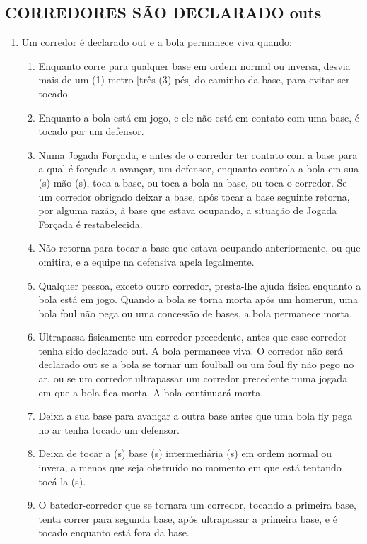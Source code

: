 \begin{multicols}{2}
	\subsection{CORREDORES S\~AO DECLARADO \glspl{out}} 
	
	\begin{enumerate}[label=\alph*)]
		\item Um corredor \'e declarado \gls{out} e a bola permanece viva quando: 
		\begin{enumerate}[label=\roman*.]
			\item Enquanto corre para qualquer base em ordem normal ou inversa, desvia mais de um (1) metro [tr\^es (3) p\'es] do caminho da base, para evitar ser tocado. 
			\item Enquanto a bola est\'a em jogo, e ele n\~ao est\'a em contato com uma base, \'e tocado por um defensor. 
			\item Numa Jogada For\c{c}ada, e antes de o corredor ter contato com a base para a qual \'e for\c{c}ado a avan\c{c}ar, um defensor, enquanto controla a bola em sua (s) m\~ao (s), toca a base, ou toca a bola na base, ou toca o corredor. Se um corredor obrigado deixar a base, ap\'os tocar a base seguinte retorna, por alguma raz\~ao, \`a base que estava ocupando, a situa\c{c}\~ao de Jogada For\c{c}ada \'e restabelecida. 
			\item N\~ao retorna para tocar a base que estava ocupando anteriormente, ou que omitira, e a equipe na defensiva apela legalmente. 
			\item Qualquer pessoa, exceto outro corredor, presta-lhe ajuda f\'isica enquanto a bola est\'a em jogo. Quando a bola se torna morta ap\'os um \gls{homerun}, uma bola \gls{foul} n\~ao pega ou uma concess\~ao de bases, a bola permanece morta. 
			\item Ultrapassa fisicamente um corredor precedente, antes que esse corredor tenha sido declarado \gls{out}. A bola permanece viva. O corredor n\~ao ser\'a declarado \gls{out} se a bola se tornar um \gls{foulball} ou um \gls{foul fly} n\~ao pego no ar, ou se um corredor ultrapassar um corredor precedente numa jogada em que a bola fica morta. A bola continuar\'a morta. 
			\item Deixa a sua base para avan\c{c}ar a outra base antes que uma bola \gls{fly} pega no ar tenha tocado um defensor. 
			\item Deixa de tocar a (s) base (s) intermedi\'aria (s) em ordem normal ou invera, a menos que seja obstru\'ido no momento em que est\'a tentando toc\'a-la (s). 
			\item O batedor-corredor que se tornara um corredor, tocando a primeira base, tenta correr para segunda base, ap\'os ultrapassar a primeira base, e \'e tocado enquanto est\'a fora da base. 

\end{enumerate}
\end{enumerate}
\end{multicols}
